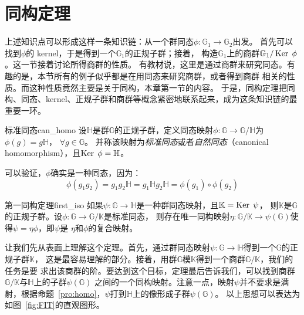 \section{同构定理}
\label{sec:Iso_Thm}
上述知识点可以形成这样一条知识链：从一个群同态$\phi\colon \mathbb{G}_1 \to \mathbb{G}_2$出发。
首先可以找到$\phi$的 kernel，于是得到一个$\mathbb{G}_1$的正规子群；接着，
构造$\mathbb{G}_1$上的商群$\mathbb{G}_1 / \operatorname{Ker}\; \phi$。这一节接着讨论所得商群的性质。
有教材说，这里是通过商群来研究同态。有趣的是，本节所有的例子似乎都是在用同态来研究商群，或者得到商群
相关的性质。而这种性质竟然主要是关于同构，本章第一节的内容。
于是，同构定理把同构、同态、kernel、正规子群和商群等概念紧密地联系起来，成为这条知识链的最重要一环。

\begin{definition}{标准同态}{can_homo}
	设$\mathbb{H}$是群$\mathbb{G}$的正规子群，定义同态映射$\phi\colon \mathbb{G} \to \mathbb{G} / \mathbb{H}$为$\phi(g) = g \mathbb{H}$，
	$\forall g \in \mathbb{G}$。
    并称该映射为\emph{标准同态}或者\emph{自然同态}（canonical homomorphism），且$\operatorname{Ker}\; \phi = \mathbb{H}$。 
\end{definition}
可以验证，$\phi$确实是一种同态，因为：
\[ \phi(g_1 g_2) = g_1 g_2  \mathbb{H} = g_1  \mathbb{H} g_2  \mathbb{H} = \phi(g_1)\circ \phi(g_2)\]
\begin{theorem}{第一同构定理}{first_iso}
如果$\psi\colon \mathbb{G} \to \mathbb{H}$是一种群同态映射，且$\mathbb{K} = \operatorname{Ker}\; \psi$，
则$\mathbb{K}$是$\mathbb{G}$的正规子群。设$\phi\colon  \mathbb{G} \to \mathbb{G} / \mathbb{K}$是标准同态，
则存在唯一同构映射$\eta\colon  \mathbb{G} / \mathbb{K} \to \psi(\mathbb{G})$使得$\psi = \eta \phi$，即$\psi$是
$\eta$和$\phi$的复合映射。
\end{theorem}
让我们先从表面上理解这个定理。首先，通过群同态映射$\psi\colon \mathbb{G} \to \mathbb{H}$得到一个$\mathbb{G}$的正规子群$\mathbb{K}$，
这是最容易理解的部分。接着，用群$\mathbb{G} $模$\mathbb{K}$得到一个商群$\mathbb{G} / \mathbb{K}$，我们的任务是要
求出该商群的阶。要达到这个目标，定理最后告诉我们，可以找到商群$\mathbb{G} / \mathbb{K}$与$\mathbb{H}$上的子群$\psi(\mathbb{G})$
之间的一个同构映射。注意一点，映射$\psi$并不要求是满射，根据命题~\ref{pro:homo}，$\psi$打到$\mathbb{H}$上的像形成子群$\psi(\mathbb{G})$。
以上思想可以表达为如图~\ref{fig:FIT}的直观图形。

